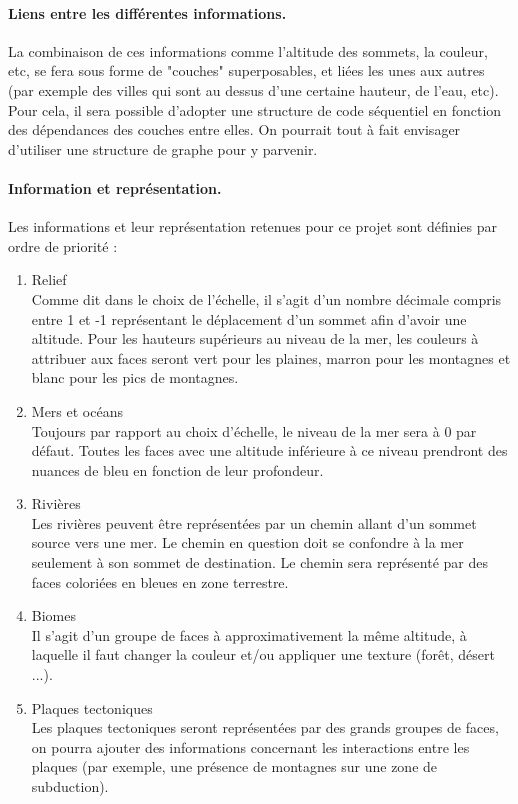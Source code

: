 \documentclass[a4paper]{article}
\begin{document}
            \paragraph{Liens entre les différentes informations.}
            La combinaison de ces informations  comme l'altitude des sommets, la couleur, etc, se fera sous forme de "couches" superposables, et liées les unes aux autres (par exemple des villes qui sont au dessus d'une certaine hauteur, de l'eau, etc). \\
            Pour cela, il  sera possible d'adopter une structure de code séquentiel en fonction des dépendances des couches entre elles. On pourrait tout à fait envisager d'utiliser une structure de graphe pour y parvenir.\\
            
            \paragraph{Information et représentation.}
            Les informations et leur représentation retenues pour ce projet sont définies par ordre de priorité :
            \begin{enumerate}
                \item {Relief} \\
                    Comme dit dans le choix de l'échelle, il s'agit d'un nombre décimale compris entre 1 et -1 représentant le déplacement d'un sommet afin d'avoir une altitude. Pour les hauteurs supérieurs au niveau de la mer, les couleurs à attribuer aux faces seront vert pour les plaines, marron pour les montagnes et blanc pour les pics de montagnes. 
                \item {Mers et océans} \\
                    Toujours par rapport au choix d'échelle, le niveau de la mer sera à 0 par défaut. Toutes les faces avec une altitude inférieure à ce niveau prendront des nuances de bleu en fonction de leur profondeur.
                \item {Rivières} \\
                    Les rivières peuvent être représentées par un chemin allant d'un sommet source vers une mer. Le chemin en question doit se confondre à la mer seulement à son sommet de destination. Le chemin sera représenté par des faces coloriées en bleues en zone terrestre.
                \item {Biomes} \\
                    Il s'agit d'un groupe de faces à approximativement la même altitude, à laquelle il faut changer la couleur et/ou appliquer une texture (forêt, désert ...).
                \item {Plaques tectoniques} \\
                    Les plaques tectoniques seront représentées par des grands groupes de faces, on pourra ajouter des informations concernant les interactions entre les plaques (par exemple, une présence de montagnes sur une zone de subduction). 
            \end{enumerate}
            
\end{document}
